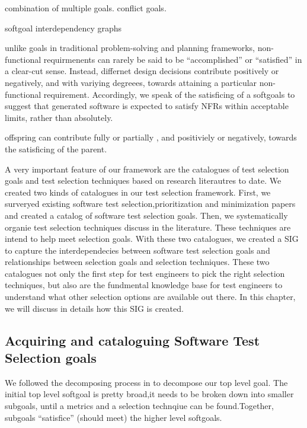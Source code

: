 combination of multiple goals. conflict goals.




\cite{non-functional requirements in software engineering}
softgoal interdependency graphs

unlike goals in traditional problem-solving and planning frameworks,
non-functional requirmenents can rarely be said to be ``accomplished'' or
``satisfied'' in a clear-cut sense. Instead, differnet design decisions
contribute positively or negatively, and with variying degreees, towards
attaining a particular non-functional requirement. Accordingly, we speak of the
satisficing of a softgoals to suggest that generated software is expected to
satisfy NFRs within acceptable limits, rather than absolutely.


offspring can contribute fully or partially , and positiviely or negatively,
towards the satisficing of the parent.





\newpage
A very important feature of our framework are the catalogues of test
selection goals and test selection techniques based on research literautres to date. We
created two kinds of catalogues in our test selection framework. First, we
surveryed existing software test selection,prioritization and minimization papers and created a catalog of software test selection goals. Then, we
systematically organie test selection techniques discuss in the literature.
These techniques are intend to help meet selection goals. With these two
catalogues, we created a SIG to capture the interdependecies
between software test selection goals and relationships between selection goals
and selection techniques. These two catalogues not only the first step for test engineers to pick the right selection techniques,
but also are the fundmental knowledge base for test engineers to understand what
other selection options are available out there. In this chapter, we will discuss in details how
this SIG is created.

\subsection{Acquiring and cataloguing Software Test Selection goals}
We followed the decomposing process in \cite{NFR} to decompose our top level
goal. The initial top level softgoal is pretty broad,it needs to be broken down
into smaller subgoals, until a metrics and a selection technqiue can be
found.Together, subgoals ``satisfice'' (should meet) the higher level softgoals.

